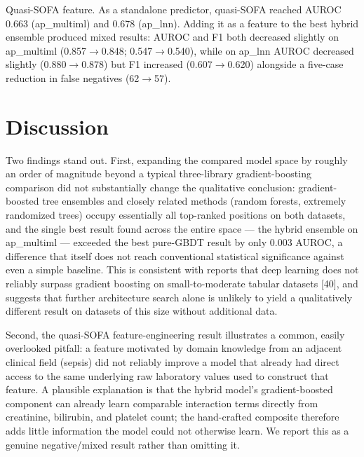 \documentclass[10pt]{article} %
\begin{document}
Quasi-SOFA feature. As a standalone predictor, quasi-SOFA reached AUROC 0.663 (ap\_multiml) and 0.678 (ap\_lnn). Adding it as a feature to the best hybrid ensemble produced mixed results: AUROC and F1 both decreased slightly on ap\_multiml (0.857$\to$0.848; 0.547$\to$0.540), while on ap\_lnn AUROC decreased slightly (0.880$\to$0.878) but F1 increased (0.607$\to$0.620) alongside a five-case reduction in false negatives (62$\to$57).

\section{Discussion}

Two findings stand out. First, expanding the compared model space by roughly an order of magnitude beyond a typical three-library gradient-boosting comparison did not substantially change the qualitative conclusion: gradient-boosted tree ensembles and closely related methods (random forests, extremely randomized trees) occupy essentially all top-ranked positions on both datasets, and the single best result found across the entire space --- the hybrid ensemble on ap\_multiml --- exceeded the best pure-GBDT result by only 0.003 AUROC, a difference that itself does not reach conventional statistical significance against even a simple baseline. This is consistent with reports that deep learning does not reliably surpass gradient boosting on small-to-moderate tabular datasets [40], and suggests that further architecture search alone is unlikely to yield a qualitatively different result on datasets of this size without additional data.

Second, the quasi-SOFA feature-engineering result illustrates a common, easily overlooked pitfall: a feature motivated by domain knowledge from an adjacent clinical field (sepsis) did not reliably improve a model that already had direct access to the same underlying raw laboratory values used to construct that feature. A plausible explanation is that the hybrid model's gradient-boosted component can already learn comparable interaction terms directly from creatinine, bilirubin, and platelet count; the hand-crafted composite therefore adds little information the model could not otherwise learn. We report this as a genuine negative/mixed result rather than omitting it.
\end{document}
